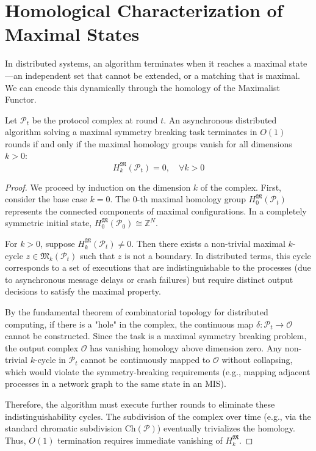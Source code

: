 \section{Homological Characterization of Maximal States}

In distributed systems, an algorithm terminates when it reaches a maximal state—an independent set that cannot be extended, or a matching that is maximal. We can encode this dynamically through the homology of the Maximalist Functor.

\begin{theorem}
\label{thm:maximal_homology}
Let $\mathcal{P}_t$ be the protocol complex at round $t$. An asynchronous distributed algorithm solving a maximal symmetry breaking task terminates in $O(1)$ rounds if and only if the maximal homology groups vanish for all dimensions $k > 0$:
\[
H_k^{\mathfrak{M}}(\mathcal{P}_t) = 0, \quad \forall k > 0
\]
\end{theorem}

\begin{proof}
We proceed by induction on the dimension $k$ of the complex. 
First, consider the base case $k=0$. The $0$-th maximal homology group $H_0^{\mathfrak{M}}(\mathcal{P}_t)$ represents the connected components of maximal configurations. In a completely symmetric initial state, $H_0^{\mathfrak{M}}(\mathcal{P}_0) \cong \mathbb{Z}^N$.

For $k > 0$, suppose $H_k^{\mathfrak{M}}(\mathcal{P}_t) \neq 0$. Then there exists a non-trivial maximal $k$-cycle $z \in \mathfrak{M}_k(\mathcal{P}_t)$ such that $z$ is not a boundary. In distributed terms, this cycle corresponds to a set of executions that are indistinguishable to the processes (due to asynchronous message delays or crash failures) but require distinct output decisions to satisfy the maximal property.

By the fundamental theorem of combinatorial topology for distributed computing, if there is a "hole" in the complex, the continuous map $\delta: \mathcal{P}_t \to \mathcal{O}$ cannot be constructed. Since the task is a maximal symmetry breaking problem, the output complex $\mathcal{O}$ has vanishing homology above dimension zero. Any non-trivial $k$-cycle in $\mathcal{P}_t$ cannot be continuously mapped to $\mathcal{O}$ without collapsing, which would violate the symmetry-breaking requirements (e.g., mapping adjacent processes in a network graph to the same state in an MIS).

Therefore, the algorithm must execute further rounds to eliminate these indistinguishability cycles. The subdivision of the complex over time (e.g., via the standard chromatic subdivision $\text{Ch}(\mathcal{P})$) eventually trivializes the homology. Thus, $O(1)$ termination requires immediate vanishing of $H_k^{\mathfrak{M}}$.
\end{proof}

